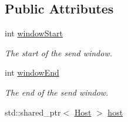 \subsection*{\-Public \-Attributes}
\begin{DoxyCompactItemize}
\item 
int \hyperlink{classFlow_a1c04de60a81b02750673806906701a76}{window\-Start}
\begin{DoxyCompactList}\small\item\em \-The start of the send window. \end{DoxyCompactList}\item 
int \hyperlink{classFlow_a8ffd0d6dd0bf1c2c2b97ac164890715f}{window\-End}
\begin{DoxyCompactList}\small\item\em \-The end of the send window. \end{DoxyCompactList}\item 
\hypertarget{classFlow_af45cdc7b3609577eb08cb072e9631809}{std\-::shared\-\_\-ptr$<$ \hyperlink{classHost}{\-Host} $>$ \hyperlink{classFlow_af45cdc7b3609577eb08cb072e9631809}{host}}\label{classFlow_af45cdc7b3609577eb08cb072e9631809}


\end{DoxyCompactItemize}
